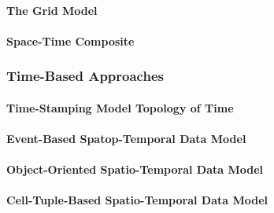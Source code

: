 

\paragraph{The Grid Model} %
\label{par:the_grid_model}


\paragraph{Space-Time Composite} %
\label{par:space_time_composite}







\subsubsection{Time-Based Approaches} %
\label{ssub:time-based_approaches}


\paragraph{Time-Stamping Model Topology of Time} %
\label{par:time_stamping_model_topology_of_time}



\paragraph{Event-Based Spatop-Temporal Data Model} %
\label{par:event_based_spatio_temporal_data_model}



\paragraph{Object-Oriented Spatio-Temporal Data Model} %
\label{par:object_oriented_spatio_temporal_data_model}



\paragraph{Cell-Tuple-Based Spatio-Temporal Data Model} %
\label{par:cell_tuple_based_spatio_temporal_data_model}


